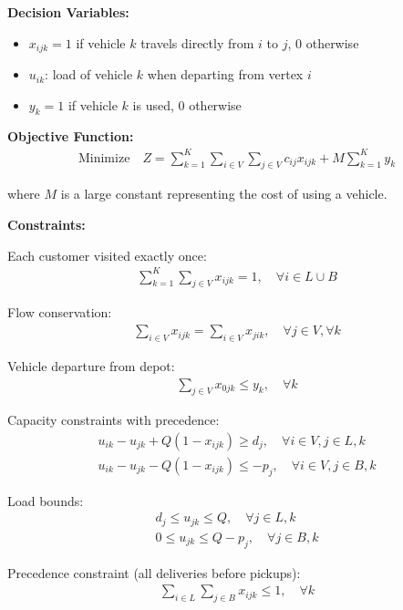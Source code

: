\documentclass{article}
\begin{document}
\textbf{Decision Variables:}
\begin{itemize}
\item \( x_{ijk} = 1 \) if vehicle \( k \) travels directly from \( i \) to \( j \), 0 otherwise
\item \( u_{ik} \): load of vehicle \( k \) when departing from vertex \( i \)
\item \( y_k = 1 \) if vehicle \( k \) is used, 0 otherwise
\end{itemize}

\textbf{Objective Function:}
\begin{align}
\text{Minimize} \quad Z = \sum_{k=1}^{K} \sum_{i \in V} \sum_{j \in V} c_{ij} x_{ijk} + M \sum_{k=1}^{K} y_k
\end{align}

where \( M \) is a large constant representing the cost of using a vehicle.

\textbf{Constraints:}

Each customer visited exactly once:
\begin{align}
\sum_{k=1}^{K} \sum_{j \in V} x_{ijk} = 1, \quad \forall i \in L \cup B
\end{align}

Flow conservation:
\begin{align}
\sum_{i \in V} x_{ijk} = \sum_{i \in V} x_{jik}, \quad \forall j \in V, \forall k
\end{align}

Vehicle departure from depot:
\begin{align}
\sum_{j \in V} x_{0jk} \leq y_k, \quad \forall k
\end{align}

Capacity constraints with precedence:
\begin{align}
u_{ik} - u_{jk} + Q(1 - x_{ijk}) \geq d_j, \quad \forall i \in V, j \in L, k \\
u_{ik} - u_{jk} - Q(1 - x_{ijk}) \leq -p_j, \quad \forall i \in V, j \in B, k
\end{align}

Load bounds:
\begin{align}
d_j \leq u_{jk} \leq Q, \quad \forall j \in L, k \\
0 \leq u_{jk} \leq Q - p_j, \quad \forall j \in B, k
\end{align}

Precedence constraint (all deliveries before pickups):
\begin{align}
\sum_{i \in L} \sum_{j \in B} x_{ijk} \leq 1, \quad \forall k
\end{align}
\end{document}
